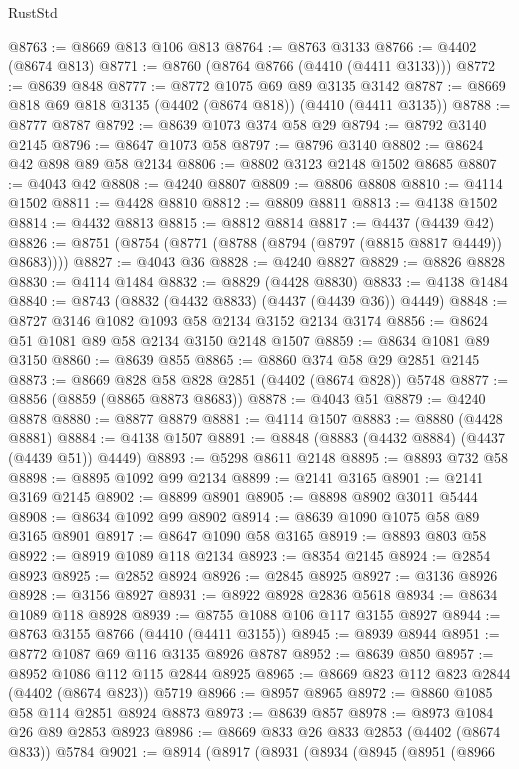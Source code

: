 \begin{lexlean}{RustStd}
\begin{coremodule}
@8763 := @8669 @813 @106 @813
@8764 := @8763 @3133
@8766 := @4402 (@8674 @813)
@8771 := @8760 (@8764 @8766 (@4410 (@4411 @3133)))
@8772 := @8639 @848
@8777 := @8772 @1075 @69 @89 @3135 @3142
@8787 := @8669 @818 @69 @818 @3135 (@4402 (@8674 @818)) (@4410 (@4411 @3135))
@8788 := @8777 @8787
@8792 := @8639 @1073 @374 @58 @29
@8794 := @8792 @3140 @2145
@8796 := @8647 @1073 @58
@8797 := @8796 @3140
@8802 := @8624 @42 @898 @89 @58 @2134
@8806 := @8802 @3123 @2148 @1502 @8685
@8807 := @4043 @42
@8808 := @4240 @8807
@8809 := @8806 @8808
@8810 := @4114 @1502
@8811 := @4428 @8810
@8812 := @8809 @8811
@8813 := @4138 @1502
@8814 := @4432 @8813
@8815 := @8812 @8814
@8817 := @4437 (@4439 @42)
@8826 := @8751 (@8754 (@8771 (@8788 (@8794 (@8797 (@8815 @8817 @4449)) @8683))))
@8827 := @4043 @36
@8828 := @4240 @8827
@8829 := @8826 @8828
@8830 := @4114 @1484
@8832 := @8829 (@4428 @8830)
@8833 := @4138 @1484
@8840 := @8743 (@8832 (@4432 @8833) (@4437 (@4439 @36)) @4449)
@8848 := @8727 @3146 @1082 @1093 @58 @2134 @3152 @2134 @3174
@8856 := @8624 @51 @1081 @89 @58 @2134 @3150 @2148 @1507
@8859 := @8634 @1081 @89 @3150
@8860 := @8639 @855
@8865 := @8860 @374 @58 @29 @2851 @2145
@8873 := @8669 @828 @58 @828 @2851 (@4402 (@8674 @828)) @5748
@8877 := @8856 (@8859 (@8865 @8873 @8683))
@8878 := @4043 @51
@8879 := @4240 @8878
@8880 := @8877 @8879
@8881 := @4114 @1507
@8883 := @8880 (@4428 @8881)
@8884 := @4138 @1507
@8891 := @8848 (@8883 (@4432 @8884) (@4437 (@4439 @51)) @4449)
@8893 := @5298 @8611 @2148
@8895 := @8893 @732 @58
@8898 := @8895 @1092 @99 @2134
@8899 := @2141 @3165
@8901 := @2141 @3169 @2145
@8902 := @8899 @8901
@8905 := @8898 @8902 @3011 @5444
@8908 := @8634 @1092 @99 @8902
@8914 := @8639 @1090 @1075 @58 @89 @3165 @8901
@8917 := @8647 @1090 @58 @3165
@8919 := @8893 @803 @58
@8922 := @8919 @1089 @118 @2134
@8923 := @8354 @2145
@8924 := @2854 @8923
@8925 := @2852 @8924
@8926 := @2845 @8925
@8927 := @3136 @8926
@8928 := @3156 @8927
@8931 := @8922 @8928 @2836 @5618
@8934 := @8634 @1089 @118 @8928
@8939 := @8755 @1088 @106 @117 @3155 @8927
@8944 := @8763 @3155 @8766 (@4410 (@4411 @3155))
@8945 := @8939 @8944
@8951 := @8772 @1087 @69 @116 @3135 @8926 @8787
@8952 := @8639 @850
@8957 := @8952 @1086 @112 @115 @2844 @8925
@8965 := @8669 @823 @112 @823 @2844 (@4402 (@8674 @823)) @5719
@8966 := @8957 @8965
@8972 := @8860 @1085 @58 @114 @2851 @8924 @8873
@8973 := @8639 @857
@8978 := @8973 @1084 @26 @89 @2853 @8923
@8986 := @8669 @833 @26 @833 @2853 (@4402 (@8674 @833)) @5784
@9021 := @8914
    (@8917
      (@8931
        (@8934
          (@8945
            (@8951
              (@8966

\end{coremodule}
\end{lexlean}
